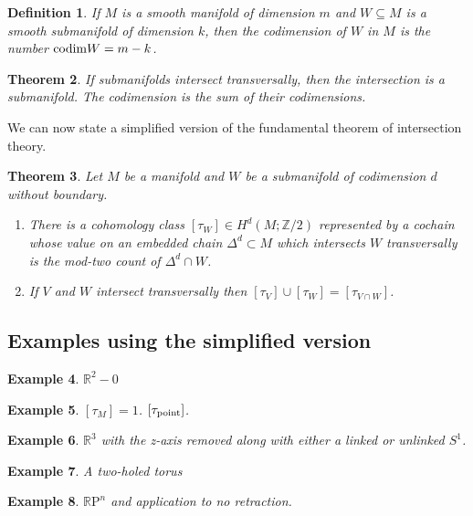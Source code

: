\documentclass{amsart}          %
\newcommand{\Z}{{\mathbb{Z}}}
\newtheorem{theorem}{Theorem}
\newtheorem{definition}[theorem]{Definition}
\newtheorem{example}[theorem]{Example}
\newcommand{\R}{\mathbb R}
\newcommand{\RP}{\mathbb{R}\mathrm{P}}
\newcommand{\codim}{{\rm codim}}
\begin{document}
\begin{definition}
If $M$ is a smooth manifold of dimension $m$ and $W\subseteq M$ is a smooth submanifold of dimension $k$, then the codimension of $W$ in $M$ is the number $\codim W=m-k$.
\end{definition}

\begin{theorem}
If submanifolds intersect transversally, then the intersection is a submanifold.  The codimension is the sum of their codimensions.
\end{theorem}

We can now state a simplified version of the fundamental theorem of intersection theory.

\begin{theorem}
Let $M$ be a manifold and $W$ be a submanifold of codimension $d$ without boundary.  
\begin{enumerate}
\item There is a cohomology class $[\tau_{W}] \in H^{d}(M; \Z/2)$ represented by a cochain whose value on an embedded chain $\Delta^{d} \subset M$ which intersects $W$ transversally is the mod-two count of $\Delta^{d} \cap W$.
\item If $V$ and $W$ intersect transversally then $[\tau_{V}] \cup [\tau_{W}] = [\tau_{V \cap W}]$.
\end{enumerate}
\end{theorem}

\subsection{Examples using the simplified version}
\begin{example}
$\R^{2} - 0$
\end{example}
\begin{example}
$[\tau_M] = 1$.  $[\tau_{{\rm point}}]$.
\end{example}
\begin{example}
$\R^{3}$ with the z-axis removed along with either a linked or unlinked $S^{1}$.
\end{example}
\begin{example}
A two-holed torus
\end{example}
\begin{example}
$\RP^{n}$ and application to no retraction.
\end{example}
\end{document}
